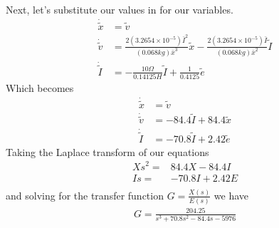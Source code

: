 \documentclass{article}
\begin{document}
    Next, let's substitute our values in for our variables.
    \begin{equation}
        \begin{aligned}
            \dot{\tilde{x}}&=\tilde{v}\\
            \dot{\tilde{v}}&=\frac{2(3.2654\times10^{-5})\bar{I}^2}{(0.068kg)\bar{x}^3}\tilde{x}-\frac{2(3.2654\times10^{-5})\bar{I}}{(0.068kg)\bar{x}^2}\tilde{I}\\
            \dot{\tilde{I}}&=-\frac{10\Omega}{0.14125H}\tilde{I}+\frac{1}{0.4125}\tilde{e}
        \end{aligned}
    \end{equation}
    Which becomes
    \begin{equation}
        \begin{aligned}
            \dot{\tilde{x}}&=\tilde{v}\\
            \dot{\tilde{v}}&=-84.4\tilde{I}+84.4\tilde{x}\\
            \dot{\tilde{I}}&=-70.8\tilde{I}+2.42\tilde{e}
        \end{aligned}
    \end{equation} 
    Taking the Laplace transform of our equations
    \begin{equation}
        \begin{aligned}
            Xs^2=&84.4X-84.4I\\
            Is=&-70.8I+2.42E\\  
        \end{aligned}
    \end{equation} 
    and solving for the transfer function $G=\frac{X(s)}{E(s)}$ we have
    \begin{equation}
        \begin{aligned}
            G = \frac{204.25}{s^3+70.8s^2-84.4s-5976}
            \label{eqn:levTrans}
        \end{aligned}
    \end{equation}
\end{document}
